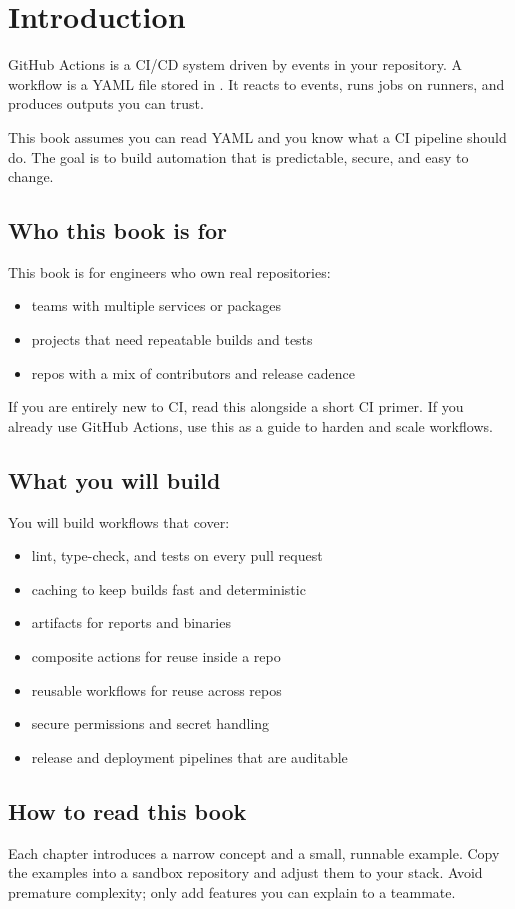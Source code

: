 \chapter{Introduction}

GitHub Actions is a CI/CD system driven by events in your repository.
A workflow is a YAML file stored in .
It reacts to events, runs jobs on runners, and produces outputs you can trust.

This book assumes you can read YAML and you know what a CI pipeline should do.
The goal is to build automation that is predictable, secure, and easy to change.

\section{Who this book is for}
This book is for engineers who own real repositories:
\begin{itemize}[nosep]
  \item teams with multiple services or packages
  \item projects that need repeatable builds and tests
  \item repos with a mix of contributors and release cadence
\end{itemize}

If you are entirely new to CI, read this alongside a short CI primer.
If you already use GitHub Actions, use this as a guide to harden and scale workflows.

\section{What you will build}
You will build workflows that cover:
\begin{itemize}[nosep]
  \item lint, type-check, and tests on every pull request
  \item caching to keep builds fast and deterministic
  \item artifacts for reports and binaries
  \item composite actions for reuse inside a repo
  \item reusable workflows for reuse across repos
  \item secure permissions and secret handling
  \item release and deployment pipelines that are auditable
\end{itemize}

\section{How to read this book}
Each chapter introduces a narrow concept and a small, runnable example.
Copy the examples into a sandbox repository and adjust them to your stack.
Avoid premature complexity; only add features you can explain to a teammate.

